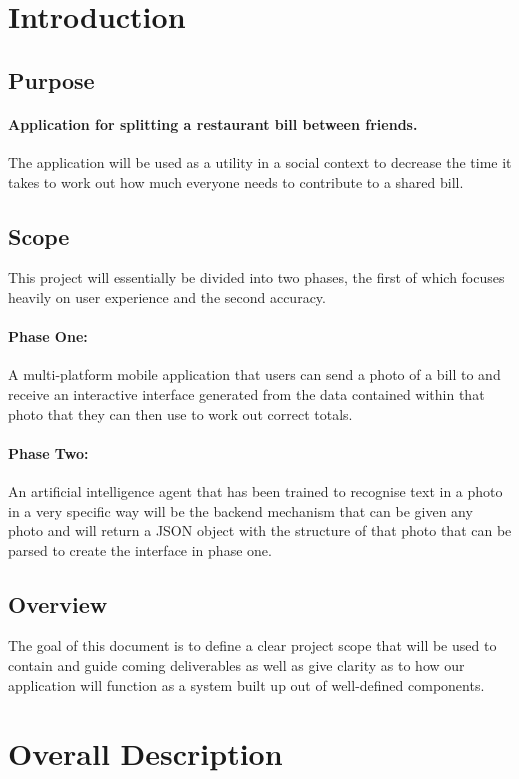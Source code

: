 \documentclass[12pt,a4paper]{article}
\begin{document}
   \section{Introduction}
   	\subsection{Purpose}
		\paragraph{Application for splitting a restaurant bill between friends.}
		The application will be used as a utility in a social context to decrease the time it takes to work out how much everyone needs to contribute to a shared bill.

   	\subsection{Scope}
   	This project will essentially be divided into two phases, the first of which focuses heavily on user experience and the second accuracy.
		\paragraph{Phase One:}
		A multi-platform mobile application that users can send a photo of a bill to and receive an interactive interface generated from the data contained within that photo that they can then use to work out correct totals.
		\paragraph{Phase Two:}
		An artificial intelligence agent that has been trained to recognise text in a photo in a very specific way will be the backend mechanism that can be given any photo and will return a JSON object with the structure of that photo that can be parsed to create the interface in phase one.

   	\subsection{Overview}
The goal of this document is to define a clear project scope that will be used to contain and guide coming deliverables as well as give clarity as to how our application will function as a system built up out of well-defined components.

   \section{Overall Description}
\end{document}

